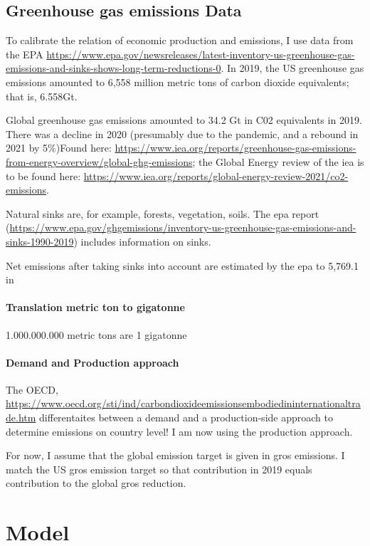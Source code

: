 \subsection{Greenhouse gas emissions Data}
To calibrate the relation of economic production and emissions, I use data from the EPA \url{https://www.epa.gov/newsreleases/latest-inventory-us-greenhouse-gas-emissions-and-sinks-shows-long-term-reductions-0}.
In 2019, the US greenhouse gas emissions amounted to 6,558 million metric tons of carbon dioxide equivalents; that is, 6.558Gt. 

Global greenhouse gas emissions amounted to 34.2 Gt in C02 equivalents in 2019. There was a decline in 2020 (presumably due to the pandemic, and a rebound in 2021 by 5\%)Found here: \url{https://www.iea.org/reports/greenhouse-gas-emissions-from-energy-overview/global-ghg-emissions}; the Global Energy review of the iea is to  be found here: \url{https://www.iea.org/reports/global-energy-review-2021/co2-emissions}.

Natural sinks are, for example, forests, vegetation, soils. 
The epa report (\url{https://www.epa.gov/ghgemissions/inventory-us-greenhouse-gas-emissions-and-sinks-1990-2019}) includes information on sinks. 

Net emissions after taking sinks into account are estimated by the epa to 5,769.1 in 
\paragraph{Translation metric ton to gigatonne}
1.000.000.000 metric tons are 1 gigatonne 

\paragraph{Demand and Production approach}
The OECD, \url{https://www.oecd.org/sti/ind/carbondioxideemissionsembodiedininternationaltrade.htm} differentaites between a demand and a production-side approach to determine emissions on country level! I am now using the production approach. 

For now, I assume that the global emission target is given in gros emissions. I match the US gros emission target so that contribution in 2019 equals contribution to the global gros reduction. 

\section{Model}
